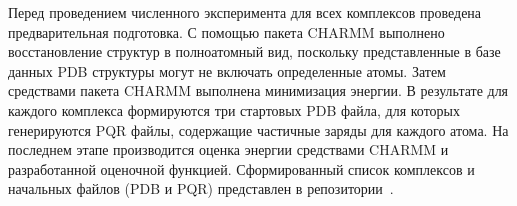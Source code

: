 Перед проведением численного эксперимента для всех комплексов проведена предварительная подготовка. С помощью пакета CHARMM выполнено восстановление структур в полноатомный вид, поскольку представленные в базе данных PDB структуры могут не включать определенные атомы. Затем средствами пакета CHARMM выполнена минимизация энергии. В результате для каждого комплекса формируются три стартовых PDB файла, для которых генерируются PQR файлы, содержащие частичные заряды для каждого атома. На последнем этапе производится оценка энергии средствами CHARMM и разработанной оценочной функцией. Сформированный список комплексов и начальных файлов (PDB и PQR) представлен в репозитории~\cite{vcs}.